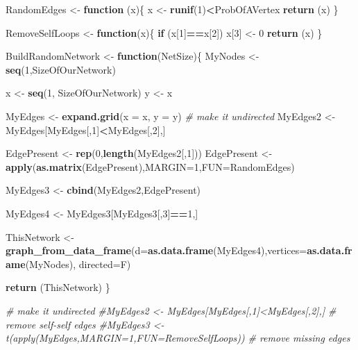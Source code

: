 \documentclass[]{article}
\newenvironment{Shaded}{\begin{snugshade}}{\end{snugshade}}
\newcommand{\CommentTok}[1]{\textcolor[rgb]{0.56,0.35,0.01}{\textit{#1}}}
\newcommand{\ControlFlowTok}[1]{\textcolor[rgb]{0.13,0.29,0.53}{\textbf{#1}}}
\newcommand{\DataTypeTok}[1]{\textcolor[rgb]{0.13,0.29,0.53}{#1}}
\newcommand{\DecValTok}[1]{\textcolor[rgb]{0.00,0.00,0.81}{#1}}
\newcommand{\KeywordTok}[1]{\textcolor[rgb]{0.13,0.29,0.53}{\textbf{#1}}}
\newcommand{\NormalTok}[1]{#1}
\newcommand{\OperatorTok}[1]{\textcolor[rgb]{0.81,0.36,0.00}{\textbf{#1}}}
\newcommand{\StringTok}[1]{\textcolor[rgb]{0.31,0.60,0.02}{#1}}
\begin{document}
\begin{Shaded}
\begin{Highlighting}[]
\NormalTok{RandomEdges <-}\StringTok{ }\ControlFlowTok{function}\NormalTok{ (x)\{}
\NormalTok{  x <-}\StringTok{ }\KeywordTok{runif}\NormalTok{(}\DecValTok{1}\NormalTok{)}\OperatorTok{<}\NormalTok{ProbOfAVertex}
  \KeywordTok{return}\NormalTok{ (x)}
\NormalTok{\}}

\NormalTok{RemoveSelfLoops <-}\StringTok{ }\ControlFlowTok{function}\NormalTok{(x)\{}
  \ControlFlowTok{if}\NormalTok{ (x[}\DecValTok{1}\NormalTok{]}\OperatorTok{==}\NormalTok{x[}\DecValTok{2}\NormalTok{])  x[}\DecValTok{3}\NormalTok{] <-}\StringTok{ }\DecValTok{0}
  \KeywordTok{return}\NormalTok{ (x)}
\NormalTok{\}}

\NormalTok{BuildRandomNetwork <-}\StringTok{ }\ControlFlowTok{function}\NormalTok{(NetSize)\{}
\NormalTok{  MyNodes <-}\StringTok{ }\KeywordTok{seq}\NormalTok{(}\DecValTok{1}\NormalTok{,SizeOfOurNetwork)}

\NormalTok{  x <-}\StringTok{ }\KeywordTok{seq}\NormalTok{(}\DecValTok{1}\NormalTok{, SizeOfOurNetwork)}
\NormalTok{  y <-}\StringTok{ }\NormalTok{x}
  
\NormalTok{  MyEdges <-}\StringTok{ }\KeywordTok{expand.grid}\NormalTok{(}\DataTypeTok{x =}\NormalTok{ x, }\DataTypeTok{y =}\NormalTok{ y)}
  \CommentTok{# make it undirected}
\NormalTok{  MyEdges2 <-}\StringTok{ }\NormalTok{MyEdges[MyEdges[,}\DecValTok{1}\NormalTok{]}\OperatorTok{<}\NormalTok{MyEdges[,}\DecValTok{2}\NormalTok{],]}

\NormalTok{  EdgePresent <-}\StringTok{ }\KeywordTok{rep}\NormalTok{(}\DecValTok{0}\NormalTok{,}\KeywordTok{length}\NormalTok{(MyEdges2[,}\DecValTok{1}\NormalTok{]))}
\NormalTok{  EdgePresent <-}\StringTok{ }\KeywordTok{apply}\NormalTok{(}\KeywordTok{as.matrix}\NormalTok{(EdgePresent),}\DataTypeTok{MARGIN=}\DecValTok{1}\NormalTok{,}\DataTypeTok{FUN=}\NormalTok{RandomEdges)}

\NormalTok{  MyEdges3 <-}\StringTok{ }\KeywordTok{cbind}\NormalTok{(MyEdges2,EdgePresent)}
  
\NormalTok{  MyEdges4 <-}\StringTok{ }\NormalTok{MyEdges3[MyEdges3[,}\DecValTok{3}\NormalTok{]}\OperatorTok{==}\DecValTok{1}\NormalTok{,]}

\NormalTok{  ThisNetwork <-}\StringTok{ }\KeywordTok{graph_from_data_frame}\NormalTok{(}\DataTypeTok{d=}\KeywordTok{as.data.frame}\NormalTok{(MyEdges4),}\DataTypeTok{vertices=}\KeywordTok{as.data.frame}\NormalTok{(MyNodes), }\DataTypeTok{directed=}\NormalTok{F) }
  
  \KeywordTok{return}\NormalTok{ (ThisNetwork)}
\NormalTok{\}}




\CommentTok{# make it undirected}
\CommentTok{#MyEdges2 <- MyEdges[MyEdges[,1]<MyEdges[,2],]}
\CommentTok{# remove self-self edges}
\CommentTok{#MyEdges3 <- t(apply(MyEdges,MARGIN=1,FUN=RemoveSelfLoops))}
\CommentTok{# remove missing edges}
\end{Highlighting}
\end{Shaded}
\end{document}
